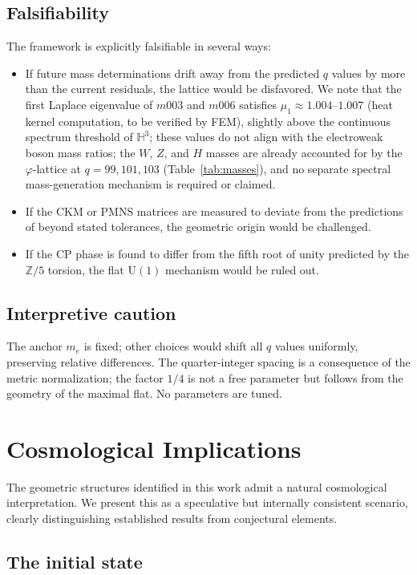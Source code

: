 ﻿\documentclass[12pt]{article}
\theoremstyle{definition}
\begin{document}
\subsection{Falsifiability}
The framework is explicitly falsifiable in several ways:
\begin{itemize}
\item If future mass determinations drift away from the predicted $q$ values by more than the current residuals, the lattice would be disfavored. We note that the first Laplace eigenvalue of $m003$ and $m006$ satisfies $\mu_1 \approx 1.004$--$1.007$ (heat kernel computation, to be verified by FEM), slightly above the continuous spectrum threshold of $\mathbb{H}^3$; these values do not align with the electroweak boson mass ratios; the $W$, $Z$, and $H$ masses are already accounted for by the $\varphi$-lattice at $q=99,101,103$ (Table~\ref{tab:masses}), and no separate spectral mass-generation mechanism is required or claimed.
\item If the CKM or PMNS matrices are measured to deviate from the predictions of \cite{Gentry:CKM,Gentry:PMNS} beyond stated tolerances, the geometric origin would be challenged.
\item If the CP phase is found to differ from the fifth root of unity predicted by the $\mathbb{Z}/5$ torsion, the flat $\mathrm{U}(1)$ mechanism would be ruled out.
\end{itemize}

\subsection{Interpretive caution}
The anchor $m_e$ is fixed; other choices would shift all $q$ values uniformly, preserving relative differences. The quarter-integer spacing is a consequence of the metric normalization; the factor $1/4$ is not a free parameter but follows from the geometry of the maximal flat. No parameters are tuned.

\section{Cosmological Implications}
\label{sec:cosmology}

The geometric structures identified in this work admit a natural
cosmological interpretation. We present this as a speculative but
internally consistent scenario, clearly distinguishing established
results from conjectural elements.

\subsection{The initial state}
\end{document}
